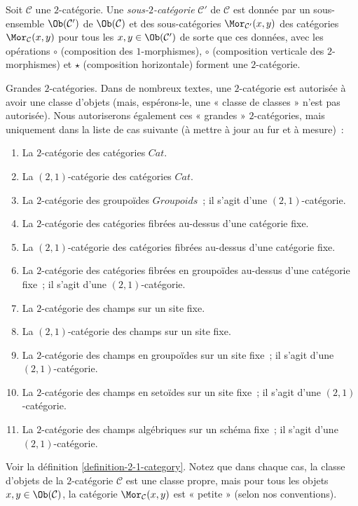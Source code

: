 \begin{definition}
\label{definition-sub-2-category}
Soit $\mathcal{C}$ une $2$-catégorie. Une {\it sous-$2$-catégorie}
$\mathcal{C}'$ de $\mathcal{C}$ est donnée par un sous-ensemble
$\Ob(\mathcal{C}')$ de $\Ob(\mathcal{C})$ et des sous-catégories
$\Mor_{\mathcal{C}'}(x, y)$ des catégories $\Mor_\mathcal{C}(x, y)$ pour tous
les $x, y \in \Ob(\mathcal{C}')$ de sorte que ces données, avec les opérations
$\circ$ (composition des $1$-morphismes), $\circ$ (composition verticale des
$2$-morphismes) et $\star$ (composition horizontale) forment une
$2$-catégorie.
\end{definition}

\begin{remark}
\label{remark-big-2-categories}
Grandes $2$-catégories. Dans de nombreux textes, une $2$-catégorie est
autorisée à avoir une classe d'objets (mais, espérons-le, une « classe de
classes » n'est pas autorisée). Nous autoriserons également ces « grandes »
$2$-catégories, mais uniquement dans la liste de cas suivante (à mettre à jour
au fur et à mesure) :
\begin{enumerate}
\item La $2$-catégorie des catégories $\textit{Cat}$.
\item La $(2, 1)$-catégorie des catégories $\textit{Cat}$.
\item La $2$-catégorie des groupoïdes $\textit{Groupoids}$ ; il s'agit d'une
$(2, 1)$-catégorie.
\item La $2$-catégorie des catégories fibrées au-dessus d'une catégorie fixe.
\item La $(2, 1)$-catégorie des catégories fibrées au-dessus d'une catégorie fixe.
\item La $2$-catégorie des catégories fibrées en groupoïdes au-dessus d'une catégorie
fixe ; il s'agit d'une $(2, 1)$-catégorie.
\item La $2$-catégorie des champs sur un site fixe.
\item La $(2, 1)$-catégorie des champs sur un site fixe.
\item La $2$-catégorie des champs en groupoïdes sur un site fixe ; il s'agit
d'une $(2, 1)$-catégorie.
\item La $2$-catégorie des champs en setoïdes sur un site fixe ; il s'agit d'une
$(2, 1)$-catégorie.
\item La $2$-catégorie des champs algébriques sur un schéma fixe ; il s'agit
d'une $(2, 1)$-catégorie.
\end{enumerate}
Voir la définition \ref{definition-2-1-category}. Notez que dans chaque cas,
la classe d'objets de la $2$-catégorie $\mathcal{C}$ est une classe propre,
mais pour tous les objets $x, y \in \Ob(\mathcal{C})$, la catégorie $\Mor_\mathcal{C}(x, y)$ est « petite » (selon nos conventions).
\end{remark}

